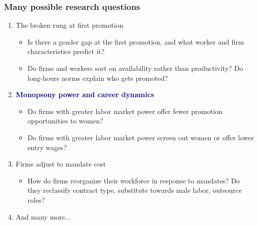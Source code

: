 \documentclass[aspectratio=169, 11pt]{beamer}
\begin{document}
\begin{frame}
\frametitle{Many possible research questions}

\begin{enumerate}
    \item \textcolor{faded}{The broken rung at first promotion}
    \begin{itemize}
        \item \textcolor{faded}{Is there a gender gap at the first promotion, and what worker and firm characteristics predict it?}
        \item \textcolor{faded}{Do firms and workers sort on availability rather than productivity? Do long-hours norms explain who gets promoted?}
    \end{itemize}
    \medskip
    \item \textbf{\textcolor{navy}{Monopsony power and career dynamics}}
    \begin{itemize}
        \item Do firms with greater labor market power offer fewer promotion opportunities to women?
        \item Do firms with greater labor market power screen out women or offer lower entry wages?
    \end{itemize}
    \medskip
    \item \textcolor{faded}{Firms adjust to mandate cost}
    \begin{itemize}
        \item \textcolor{faded}{How do firms reorganize their workforce in response to mandates? Do they reclassify contract type, substitute towards male labor, outsource roles?}
    \end{itemize}
        \item \textcolor{faded}{And many more...}

\end{enumerate}

\end{frame}
\end{document}
